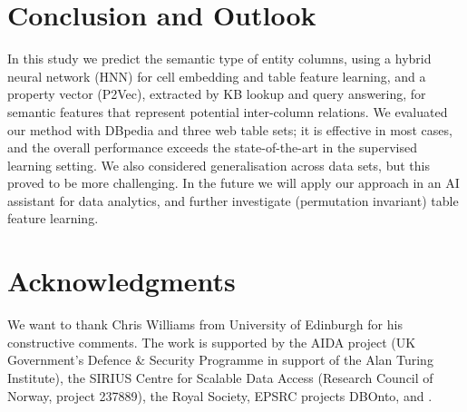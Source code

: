 \documentclass{article}
\begin{document}
\section{Conclusion and Outlook}\label{sec:conclution}
In this study we predict the semantic type of entity columns, 
using a hybrid neural network (HNN) for cell embedding and table feature learning,
and a property vector (P2Vec), extracted by KB lookup and query answering, for semantic features that represent potential inter-column relations.
We evaluated our method with DBpedia and three web table sets;
it is effective in most cases, and the overall performance exceeds the state-of-the-art in the supervised learning setting. 
We also considered generalisation across data sets, but this proved to be more challenging.
In the future we will apply our approach in an AI assistant for data analytics, and further investigate (permutation invariant) table feature learning.


\section{Acknowledgments}
We want to thank Chris Williams from University of Edinburgh for his constructive comments.
The work is supported by the AIDA project (UK Government's Defence \& Security Programme in support of the Alan Turing Institute), 
the SIRIUS Centre for Scalable Data Access (Research Council of Norway, project 237889),
the Royal Society,
EPSRC projects DBOnto,  and . 



\end{document}
